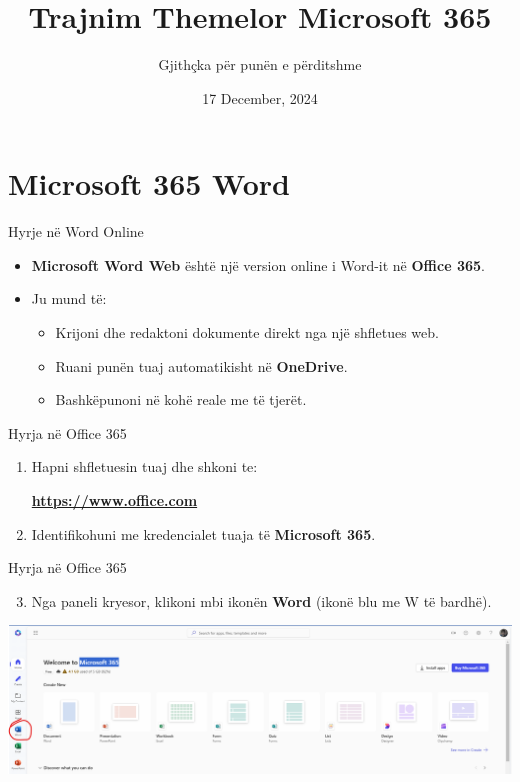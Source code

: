 \documentclass[
  ignorenonframetext,
]{beamer}
\title{Trajnim Themelor Microsoft 365}
\subtitle{Gjithçka për punën e përditshme}
\author{}
\date{\vspace{-2.5em}17 December, 2024}
\providecommand{\tightlist}{%
  \setlength{\itemsep}{0pt}\setlength{\parskip}{0pt}}
\begin{document}
\frame{\titlepage}

\begin{frame}[allowframebreaks]
  \tableofcontents[hideallsubsections]
\end{frame}
\section{Microsoft 365 Word}\label{microsoft-365-word}

\begin{frame}{Hyrje në Word Online}
\label{hyrje-nuxeb-word-online}
\begin{itemize}
\item
  \textbf{Microsoft Word Web} është një version online i Word-it në
  \textbf{Office 365}.
\item
  Ju mund të:

  \begin{itemize}
  \item
    Krijoni dhe redaktoni dokumente direkt nga një shfletues web.
  \item
    Ruani punën tuaj automatikisht në \textbf{OneDrive}.
  \item
    Bashkëpunoni në kohë reale me të tjerët.
  \end{itemize}
\end{itemize}
\end{frame}

\begin{frame}{Hyrja në Office 365}
\label{hyrja-nuxeb-office-365}
\begin{enumerate}
\item
  Hapni shfletuesin tuaj dhe shkoni te:

  \textbf{\url{https://www.office.com}}
\item
  Identifikohuni me kredencialet tuaja të \textbf{Microsoft 365}.
\end{enumerate}
\end{frame}

\begin{frame}{Hyrja në Office 365}
\label{hyrja-nuxeb-office-365-1}
\begin{enumerate}
\setcounter{enumi}{2}
\tightlist
\item
  Nga paneli kryesor, klikoni mbi ikonën \textbf{Word} (ikonë blu me W
  të bardhë).
\end{enumerate}

\includegraphics{./images/word1.png}
\end{frame}
\end{document}
